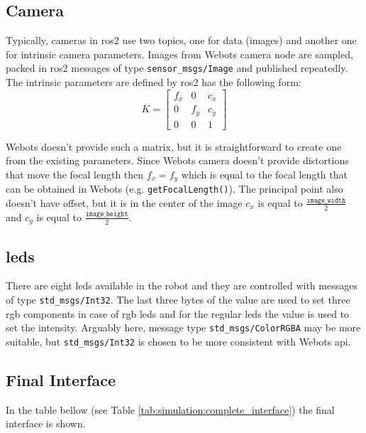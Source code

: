 \subsection{Camera}
Typically, cameras in \ac{ros2} use two topics, one for data (images) and another one for intrinsic camera parameters.
Images from Webots camera node are sampled, packed in \ac{ros2} messages of type \texttt{sensor\_msgs/Image} and published repeatedly.
The intrinsic parameters are defined by \ac{ros2} has the following form:
\begin{equation}
K = \begin{bmatrix}
    f_x & 0 & c_x \\
    0 & f_y & c_y \\
    0 & 0 & 1
\end{bmatrix}
\end{equation}

Webots doesn't provide such a matrix, but it is straightforward to create one from the existing parameters.
Since Webots camera doesn't provide distortions that move the focal length then $f_x = f_y$ which is equal to the focal length that can be obtained in Webots (e.g. \texttt{getFocalLength()}).
The principal point also doesn't have offset, but it is in the center of the image $c_x$ is equal to $ \frac{\texttt{image\_width}}{2} $ and $c_y$ is equal to $ \frac{\texttt{image\_height}}{2} $.

\subsection{\acsp{led}}
There are eight \acsp{led} available in the robot and they are controlled with messages of type \texttt{std\_msgs/Int32}.
The last three bytes of the value are used to set three \ac{rgb} components in case of \acs{rgb} \acsp{led} and for the regular \acp{led} the value is used to set the intensity.
Arguably here, message type \texttt{std\_msgs/ColorRGBA} may be more suitable, but \texttt{std\_msgs/Int32} is chosen to be more consistent with Webots \ac{api}.

\subsection{Final Interface}

In the table bellow (see Table \ref{tab:simulation:complete_interface}) the final interface is shown.

